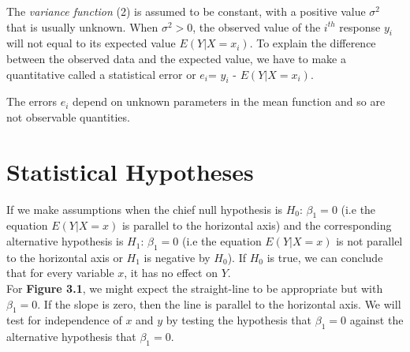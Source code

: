 \documentclass{article}
\begin{document}
    The \textit{variance function} (2) is assumed to be constant, with a positive value ${\sigma ^ {2}}$ that is usually unknown. When ${\sigma ^ {2} > 0}$, the observed value of the ${i^{th}}$ response ${y_{i}}$ will not equal to its expected value ${E(Y|X=x_{i})}$. To explain the difference between the observed data and the expected value, we have to make a quantitative called a statistical error or ${e_{i}}$= ${y_{i}}$ - ${E(Y|X=x_{i})}$. 
    
    The errors ${e_{i}}$ depend on unknown parameters in the mean function and so are not observable quantities.
   

\section{Statistical Hypotheses}
    If we make assumptions when the chief null hypothesis is ${H_{0}}$: ${\beta_{1} = 0}$ (i.e the equation ${E(Y|X=x)}$ is parallel to the horizontal axis) and the corresponding alternative hypothesis is ${H_{1}}$: ${\beta_{1} = 0}$ (i.e the equation ${E(Y|X=x)}$ is not parallel to the horizontal axis or ${H_{1}}$ is negative by ${H_{0}}$). If ${H_{0}}$ is true, we can conclude that for every variable $x$, it has no effect on $Y$. 
    \\
    
    For \textbf{Figure 3.1}, we might expect the straight-line to be appropriate but with ${\beta_{1} = 0}$. If the slope is zero, then the line is parallel to the horizontal axis. We will test for independence of $x$ and $y$ by testing the hypothesis that ${\beta_{1} = 0}$ against the alternative hypothesis that ${\beta_{1} = 0}$.
    
\end{document}
